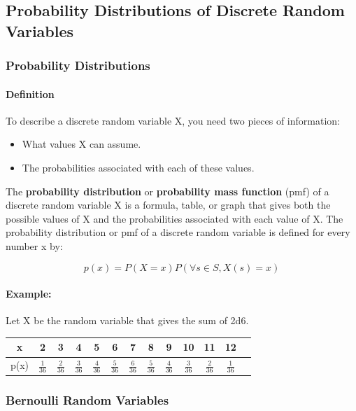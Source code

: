 \subsection{Probability Distributions of Discrete Random Variables}
\hrulefill

\subsubsection*{Probability Distributions}
\paragraph*{Definition}
To describe a discrete random variable X, you need two pieces of information:
\begin{itemize}
    \item What values X can assume.
    \item The probabilities associated with each of these values.
\end{itemize}

The \textbf{probability distribution} or \textbf{probability mass function} (pmf) of a discrete random variable X
is a formula, table, or graph that gives both the possible values of X and the probabilities associated with each value 
of X. The probability distribution or pmf of a discrete random variable is defined for every number x by:

\[
    p(x) = P(X = x) P(\forall s \in S, X(s) = x)
\]

\paragraph*{Example:}
Let X be the random variable that gives the sum of 2d6.
\begin{table}[h!]
    \centering
    \begin{tabular}{c|c|c|c|c|c|c|c|c|c|c|c|c}
        x & 2 & 3 & 4 & 5 & 6 & 7 & 8 & 9 & 10 & 11 & 12 \\
        \hline
        p(x) & $\frac{1}{36}$ & $\frac{2}{36}$ & $\frac{3}{36}$ & $\frac{4}{36}$ & $\frac{5}{36}$ & $\frac{6}{36}$ & $\frac{5}{36}$ & $\frac{4}{36}$ & $\frac{3}{36}$ & $\frac{2}{36}$ & $\frac{1}{36}$
    \end{tabular}
\end{table}

\subsubsection*{Bernoulli Random Variables}
